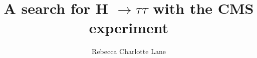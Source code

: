 \documentclass{mythesis}
\title{A search for H $\rightarrow\tau\tau$ with the CMS experiment}
\author{Rebecca Charlotte Lane}
\begin{document}
\begin{frontmatter}
  
\end{frontmatter}

\begin{mainmatter}
  
  
  
  
  
  
\end{mainmatter}

%  

\begin{backmatter}
  
\end{backmatter}

\end{document}
